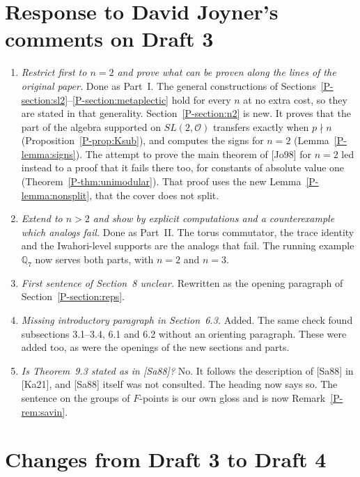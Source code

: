 \documentclass[12pt,letterpaper]{amsart}
\newcommand{\cO}{\mathcal{O}}
\begin{document}
\section{Response to David Joyner's comments on Draft 3}

\begin{enumerate}[leftmargin=1.5em]
\item \emph{Restrict first to $n=2$ and prove what can be proven along
the lines of the original paper.} Done as Part~I. The general
constructions of Sections~\ref{P-section:sl2}--\ref{P-section:metaplectic}
hold for every $n$ at no extra cost, so they are stated in that
generality. Section~\ref{P-section:n2} is new. It proves that the part
of the algebra supported on $SL(2,\cO)$ transfers exactly when
$p\nmid n$ (Proposition~\ref{P-prop:Ksub}), and computes the signs for
$n=2$ (Lemma~\ref{P-lemma:signs}). The attempt to prove the main
theorem of [Jo98] for $n=2$ led instead to a proof that it fails there
too, for constants of absolute value one
(Theorem~\ref{P-thm:unimodular}). That proof uses the new
Lemma~\ref{P-lemma:nonsplit}, that the cover does not split.
\item \emph{Extend to $n>2$ and show by explicit computations and a
counterexample which analogs fail.} Done as Part~II. The torus
commutator, the trace identity and the Iwahori-level supports are the
analogs that fail. The running example $\mathbb{Q}_7$ now serves both
parts, with $n=2$ and $n=3$.
\item \emph{First sentence of Section~8 unclear.} Rewritten as the
opening paragraph of Section~\ref{P-section:reps}.
\item \emph{Missing introductory paragraph in Section~6.3.} Added. The
same check found subsections 3.1--3.4, 6.1 and 6.2 without an
orienting paragraph. These were added too, as were the openings of the
new sections and parts.
\item \emph{Is Theorem~9.3 stated as in [Sa88]?} No. It follows the
description of [Sa88] in [Ka21], and [Sa88] itself was not consulted.
The heading now says so. The sentence on the groups of $F$-points is
our own gloss and is now Remark~\ref{P-rem:savin}.
\end{enumerate}

\section{Changes from Draft 3 to Draft 4}
\label{sec:d3d4}
\end{document}
